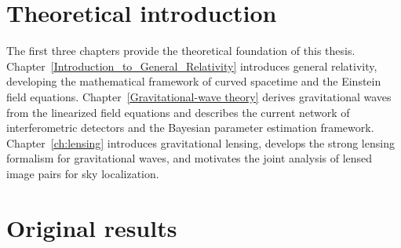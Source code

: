 \documentclass[oneside, 11pt]{book}
\begin{document}
\part{Theoretical introduction}
\vspace{4cm}
The first three chapters provide the theoretical foundation of this thesis. Chapter~\ref{Introduction_to_General_Relativity} introduces 
general relativity, developing the mathematical framework of curved spacetime and the Einstein field equations. 
Chapter~\ref{Gravitational-wave theory} derives gravitational waves from the linearized field equations and describes the current network of interferometric detectors and the Bayesian parameter estimation framework. Chapter~\ref{ch:lensing} introduces gravitational lensing, develops the strong lensing formalism for gravitational waves, and motivates the joint analysis of lensed image pairs for sky localization.



\part{Original results}




\printbibliography[heading=bibintoc, title={Bibliography}]

\appendix


\end{document}
